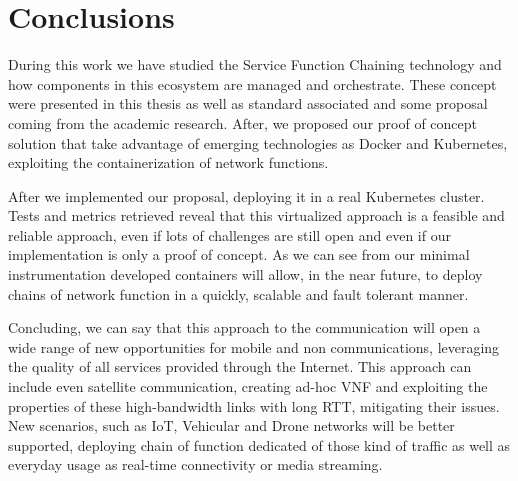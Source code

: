 \chapter{Conclusions}
\label{chap:conclusions}

During this work we have studied the Service Function Chaining
technology and how components in this ecosystem are managed and orchestrate.
These concept were presented in this thesis as well as standard associated and
some proposal coming from the academic research. After, we proposed our
proof of concept solution that take advantage of emerging technologies as Docker
and Kubernetes, exploiting the containerization of network functions.

After we implemented our proposal, deploying it in a real Kubernetes cluster.
Tests and metrics retrieved reveal that this virtualized approach is a feasible
and reliable approach, even if lots of challenges are still open and even if our
implementation is only a proof of concept. As we can see from our
minimal instrumentation developed containers will allow, in the near future, to
deploy chains of network function in a quickly, scalable and fault tolerant
manner. 

Concluding, we can say that this approach to the communication will open a wide
range of new opportunities for mobile and non communications, leveraging the
quality of all services provided through the Internet. This approach can include
even satellite communication, creating ad-hoc VNF and exploiting the properties
of these high-bandwidth links with long RTT, mitigating their issues. New
scenarios, such as IoT, Vehicular and Drone networks will be better supported,
deploying chain of function dedicated of those kind of traffic as well as
everyday usage as real-time connectivity or media streaming.